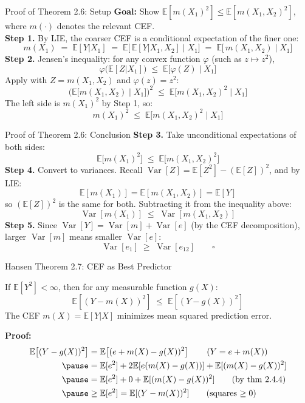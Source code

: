 \documentclass[aspectratio=169]{beamer}
\numberwithin{equation}{section}
\begin{document}
\begin{frame}{Proof of Theorem 2.6: Setup}
\textbf{Goal:} Show $\mathbb{E}[m(X_1)^2] \leq \mathbb{E}[m(X_1,X_2)^2]$, where $m(\cdot)$ denotes the relevant CEF.\\ \medskip\pause
\textbf{Step 1.} By LIE, the coarser CEF is a conditional expectation of the finer one:
$$m(X_1) \;=\; \mathbb{E}[Y|X_1] \;=\; \mathbb{E}\!\big[\,\mathbb{E}[Y|X_1,X_2]\;\big|\;X_1\big] \;=\; \mathbb{E}\!\big[\,m(X_1,X_2)\;\big|\;X_1\big]$$
\pause
\textbf{Step 2.} Jensen's inequality: for any convex function $\varphi$ (such as $z\mapsto z^2$),
$$\varphi\!\big(\mathbb{E}[Z|X_1]\big) \;\leq\; \mathbb{E}\!\big[\varphi(Z)\;\big|\;X_1\big]$$
\pause
Apply with $Z = m(X_1,X_2)$ and $\varphi(z)=z^2$:
$$\Big(\mathbb{E}\!\big[m(X_1,X_2)\;\big|\;X_1\big]\Big)^{\!2} \;\leq\; \mathbb{E}\!\big[m(X_1,X_2)^2\;\big|\;X_1\big]$$
\pause
The left side is $m(X_1)^2$ by Step 1, so:
$$m(X_1)^2 \;\leq\; \mathbb{E}\!\big[m(X_1,X_2)^2\;\big|\;X_1\big]$$
\end{frame}

\begin{frame}{Proof of Theorem 2.6: Conclusion}
\textbf{Step 3.} Take unconditional expectations of both sides:
$$\mathbb{E}\!\big[m(X_1)^2\big] \;\leq\; \mathbb{E}\!\big[m(X_1,X_2)^2\big]$$
\pause
\textbf{Step 4.} Convert to variances. Recall $\operatorname{Var}[Z]=\mathbb{E}[Z^2]-(\mathbb{E}[Z])^2$, and by LIE:
$$\mathbb{E}[m(X_1)]=\mathbb{E}[m(X_1,X_2)]=\mathbb{E}[Y]$$
so $(\mathbb{E}[Z])^2$ is the same for both.  Subtracting it from the inequality above:
$$\operatorname{Var}[m(X_1)] \;\leq\; \operatorname{Var}[m(X_1,X_2)]$$
\pause
\textbf{Step 5.} Since $\operatorname{Var}[Y]=\operatorname{Var}[m]+\operatorname{Var}[e]$ (by the CEF decomposition), larger $\operatorname{Var}[m]$ means smaller $\operatorname{Var}[e]$:
$$\operatorname{Var}[e_1] \;\geq\; \operatorname{Var}[e_{12}] \qquad \square$$
\end{frame}


\begin{frame}{Hansen Theorem 2.7: CEF as Best Predictor}
\begin{tcolorbox}[colback=blue!5, colframe=blue!50, title=Theorem 2.7 (CEF Is the Best Predictor)]
If $\mathbb{E}[Y^2]<\infty$, then for any measurable function $g(X)$:
$$\mathbb{E}\!\left[(Y-m(X))^2\right] \;\leq\; \mathbb{E}\!\left[(Y-g(X))^2\right]$$
The CEF $m(X)=\mathbb{E}[Y|X]$ minimizes mean squared prediction error.
\end{tcolorbox}
\vspace{-2pt}
{\small\textbf{Proof:}}\pause
{\footnotesize
\begin{align*}
\mathbb{E}\!\left[(Y-g(X))^2\right]&=\mathbb{E}\!\left[(e+m(X)-g(X))^2\right] \tag{$Y= e+m(X)$}\\ \pause
&=\mathbb{E}[e^2]+2\mathbb{E}[e(m(X)-g(X))]+\mathbb{E}[(m(X)-g(X))^2]\\\pause
 &=\mathbb{E}[e^2]+0+\mathbb{E}[(m(X)-g(X))^2] \tag{by thm 2.4.4}\\\pause
  &\geq \mathbb{E}[e^2] = \mathbb{E}[(Y-m(X))^2] \tag{squares $\geq 0$}
 \end{align*}}
\end{frame}
\end{document}
